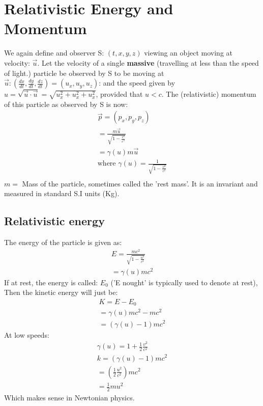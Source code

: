 \documentclass[10pt]{report}
\begin{document}
{\section{Relativistic Energy and Momentum}
\par{We again define and observer S: $\left(t,x,y,z\right)$ viewing an object moving at velocity: $\vec{u}$. Let the velocity of a single \textbf{massive} (travelling at less than the speed of light.) particle be observed by S to be moving at $\vec{u}:\left(\frac{dx}{dt},\frac{dy}{dt},\frac{dz}{dt}\right)=\left(u_{x},u_{y},u_{z}\right)$: and the speed given by $u=\sqrt{\vec{u}\cdot\vec{u}}=\sqrt{u_{x}^{2}+u_{x}^{2}+u_{x}^{2}}$, provided that $u<c$. The (relativistic) momentum of this particle as observed by S is now:}
\begin{align*}
	\vec{p}=\left(p_{x},p_{y},p_{z}\right) \\
	=\frac{m\vec{u}}{\sqrt{1-\frac{v^{2}}{c^{2}}}} \\
	=\gamma \left(u\right)m\vec{u} \\
	\text{where } \gamma\left(u\right)=\frac{1}{\sqrt{1-\frac{v^{2}}{c^{2}}}} \\
\end{align*}
$m=$ Mass of the particle, sometimes called the 'rest mass'. It is an invariant and measured in standard S.I units (Kg).
\subsection{Relativistic energy}
\par{The energy of the particle is given as:}
\begin{align*}
	E=\frac{mc^{2}}{\sqrt{1-\frac{u^{2}}{c^{2}}}} \\
	=\gamma\left(u\right)mc^{2}
\end{align*}
If at rest, the energy is called: $E_{0}$ ('E nought' is typically used to denote at rest), Then the kinetic energy will just be:
\begin{align*}
	K=E-E_{0} \\
	=\gamma\left(u\right)mc^{2}-mc^{2} \\
	=\left(\gamma\left(u\right)-1\right)mc^{2}
\end{align*}
At low speeds: 
\begin{align*}
\gamma\left(u\right)=1+\frac{1}{2}\frac{v^{2}}{c^{2}} \\
k=\left(\gamma\left(u\right)-1\right)mc^{2}\\
=\left(\frac{1}{2}\frac{u^{2}}{c^{2}}\right)mc^{2} \\
=\frac{1}{2}mu^{2}
\end{align*}
Which makes sense in Newtonian physics.
}
\end{document}
